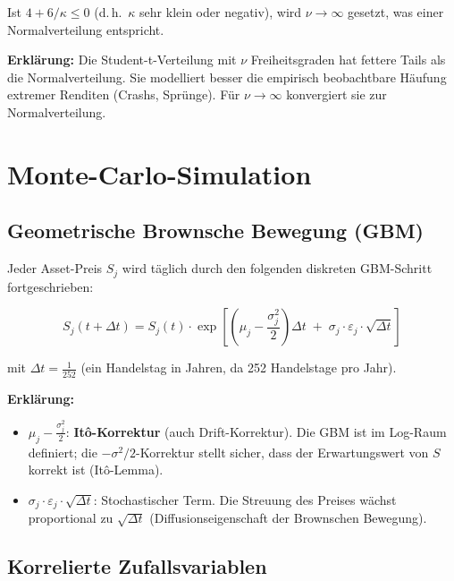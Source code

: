 \documentclass[12pt, a4paper]{article}
\begin{document}
Ist $4 + 6/\kappa \leq 0$ (d.\,h.\ $\kappa$ sehr klein oder negativ), wird
$\nu \to \infty$ gesetzt, was einer Normalverteilung entspricht.

\textbf{Erklärung:} Die Student-t-Verteilung mit $\nu$ Freiheitsgraden hat fettere
Tails als die Normalverteilung. Sie modelliert besser die empirisch beobachtbare
Häufung extremer Renditen (Crashs, Sprünge). Für $\nu \to \infty$ konvergiert
sie zur Normalverteilung.

\section{Monte-Carlo-Simulation}

\subsection{Geometrische Brownsche Bewegung (GBM)}

Jeder Asset-Preis $S_j$ wird täglich durch den folgenden diskreten GBM-Schritt
fortgeschrieben:

\begin{equation}
    S_j(t + \Delta t) = S_j(t) \cdot \exp\!\left[
        \left(\mu_j - \frac{\sigma_j^2}{2}\right)\Delta t
        \;+\;
        \sigma_j \cdot \varepsilon_j \cdot \sqrt{\Delta t}
    \right]
\end{equation}

mit $\Delta t = \frac{1}{252}$ (ein Handelstag in Jahren, da 252 Handelstage
pro Jahr).

\textbf{Erklärung:}
\begin{itemize}[leftmargin=1.5em]
    \item $\mu_j - \frac{\sigma_j^2}{2}$: \textbf{Itô-Korrektur} (auch Drift-Korrektur).
          Die GBM ist im Log-Raum definiert; die $-\sigma^2/2$-Korrektur stellt
          sicher, dass der Erwartungswert von $S$ korrekt ist (Itô-Lemma).
    \item $\sigma_j \cdot \varepsilon_j \cdot \sqrt{\Delta t}$: Stochastischer Term.
          Die Streuung des Preises wächst proportional zu $\sqrt{\Delta t}$
          (Diffusionseigenschaft der Brownschen Bewegung).
\end{itemize}

\subsection{Korrelierte Zufallsvariablen}
\end{document}
